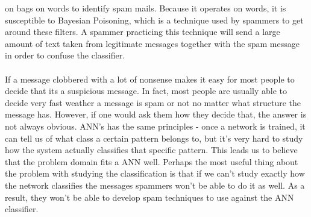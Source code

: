 on bags on words to identify spam mails. Because it operates on words, it is
susceptible to Bayesian Poisoning, which is a technique used by spammers to get
around these filters. A spammer practicing this technique will send a large
amount of text taken from legitimate messages together with the spam message in
order to confuse the classifier.  \\\\ If a message clobbered with a lot of
nonsense makes it easy for most people to decide that its a suspicious message.
In fact, most people are usually able to decide very fast weather a message is
spam or not no matter what structure the message has. However, if one would ask
them how they decide that, the answer is not always obvious.  
ANN's has the same principles - once a network is trained, it can
tell us of what class a certain pattern belongs to, but it's very hard to study
how the system actually classifies that specific pattern. This leads us to
believe that the problem domain fits a ANN well. Perhaps the most useful thing
about the problem with studying the classification is that if we can't study
exactly how the network classifies the messages spammers won't be able to do it
as well. As a result, they won't be able to develop spam techniques to use
against the ANN classifier.
